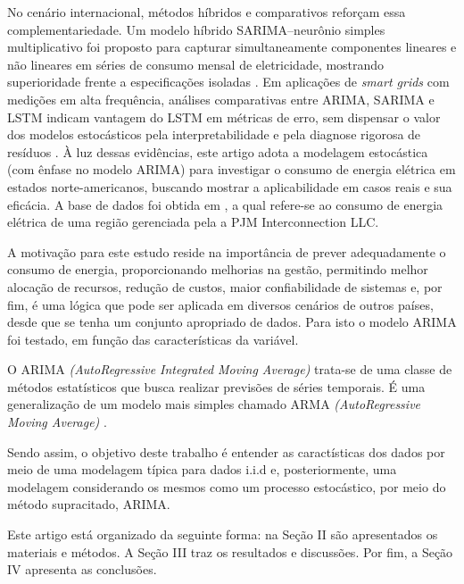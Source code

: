 \documentclass[journal]{IEEEtran}
\begin{document}
No cenário internacional, métodos híbridos e comparativos reforçam essa complementariedade. Um modelo híbrido SARIMA--neurônio simples multiplicativo foi proposto para capturar simultaneamente componentes lineares e não lineares em séries de consumo mensal de eletricidade, mostrando superioridade frente a especificações isoladas \cite{velasquez2013}. Em aplicações de \textit{smart grids} com medições em alta frequência, análises comparativas entre ARIMA, SARIMA e LSTM indicam vantagem do LSTM em métricas de erro, sem dispensar o valor dos modelos estocásticos pela interpretabilidade e pela diagnose rigorosa de resíduos \cite{dubey2021}. À luz dessas evidências, este artigo adota a modelagem estocástica (com ênfase no modelo ARIMA) para investigar o consumo de energia elétrica em estados norte-americanos, buscando mostrar a aplicabilidade em casos reais e sua eficácia. A base de dados foi obtida em \cite{Kaggle2025}, a qual refere-se ao consumo de energia elétrica de uma região gerenciada pela a PJM Interconnection LLC. 

A motivação para este estudo reside na importância de prever adequadamente o consumo de energia, proporcionando melhorias na gestão, permitindo melhor alocação de recursos, redução de custos, maior confiabilidade de sistemas e, por fim, é uma lógica que pode ser aplicada em diversos cenários de outros países, desde que se tenha um conjunto apropriado de dados. Para isto o modelo ARIMA foi testado, em função das características da variável.

O ARIMA \emph{(AutoRegressive   Integrated Moving Average)} trata-se de uma classe de métodos estatísticos que busca realizar previsões de séries temporais. É uma   generalização   de   um   modelo   mais   simples chamado  ARMA \emph{(AutoRegressive Moving  Average)}\cite{ynoguti2012} \cite{leon2008}.


Sendo assim, o objetivo deste trabalho é entender as caractísticas dos dados por meio de uma modelagem típica para dados i.i.d e, posteriormente, uma modelagem considerando os mesmos como um processo estocástico, por meio do método supracitado, ARIMA.

Este artigo está organizado da seguinte forma: na Seção II são apresentados os materiais e métodos. A Seção III traz os resultados e discussões. Por fim, a Seção IV apresenta as conclusões.



\end{document}
